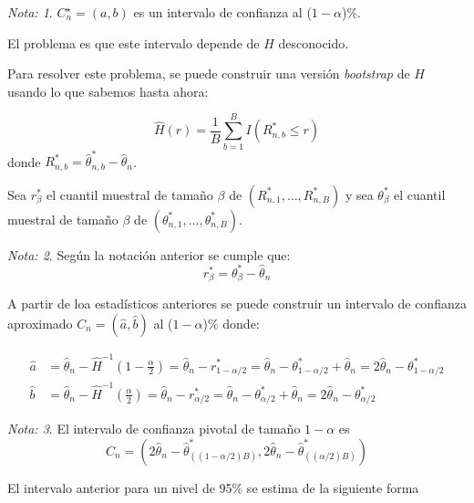 \documentclass[
  12pt,
]{book}
\theoremstyle{definition}
\theoremstyle{definition}
\theoremstyle{definition}
\theoremstyle{definition}
\theoremstyle{remark}
\newtheorem*{remark}{Nota: }
\begin{document}
\begin{remark}
\(C_{n}^{\star}=(a, b)\) es un intervalo de confianza al (\(1-\alpha\))\%.

El problema es que este intervalo depende de \(H\) desconocido.
\end{remark}

Para resolver este problema, se puede construir una versión \emph{bootstrap} de \(H\) usando lo que sabemos hasta ahora:

\[
\widehat{H}(r)=\frac{1}{B} \sum_{b=1}^{B} I\left(R_{n, b}^{*} \leq r\right)
\]
donde \(R_{n, b}^{*}=\widehat{\theta}_{n, b}^{*}-\widehat{\theta}_{n}\).

Sea \(r_{\beta}^{*}\) el cuantil muestral de tamaño \(\beta\) de \(\left(R_{n, 1}^{*}, \ldots, R_{n, B}^{*}\right)\) y sea \(\theta_{\beta}^{*}\) el cuantil muestral de tamaño \(\beta\) de \(\left(\theta_{n, 1}^{*}, \ldots, \theta_{n, B}^{*}\right)\).

\begin{remark}
Según la notación anterior se cumple que:
\begin{equation*}
r_{\beta}^{*}= \theta_{\beta}^{*}-\widehat{\theta}_{n}
\end{equation*}
\end{remark}

A partir de loa estadísticos anteriores se puede construir un intervalo de confianza aproximado \(C_{n}=(\widehat{a}, \widehat{b})\) al (\(1-\alpha\))\% donde:

\begin{align*}
\widehat{a}&= \widehat{\theta}_{n}-\widehat{H}^{-1}\left(1-\frac{\alpha}{2}\right) = \widehat{\theta}_{n}-r_{1-\alpha / 2}^{*} = \widehat{\theta}_{n}-\theta_{1-\alpha / 2}^{*} + \widehat{\theta}_{n} =2 \widehat{\theta}_{n}-\theta_{1-\alpha / 2}^{*} \\
\widehat{b} &=\widehat{\theta}_{n}-\widehat{H}^{-1}\left(\frac{\alpha}{2}\right)
=\widehat{\theta}_{n}-r_{\alpha / 2}^{*}
= \widehat{\theta}_{n}-\theta_{\alpha / 2}^{*} + \widehat{\theta}_{n}
=2 \widehat{\theta}_{n}-\theta_{\alpha / 2}^{*}
\end{align*}

\begin{remark}
El intervalo de confianza pivotal de tamaño \(1-\alpha\) es
\[
  C_{n}=\left(2 \widehat{\theta}_{n}-\widehat{\theta}_{((1-\alpha / 2) B)}^{*}, 2 \widehat{\theta}_{n}-\widehat{\theta}_{((\alpha / 2) B)}^{*}\right)
  \]
\end{remark}

El intervalo anterior para un nivel de 95\% se estima de la siguiente forma
\end{document}
